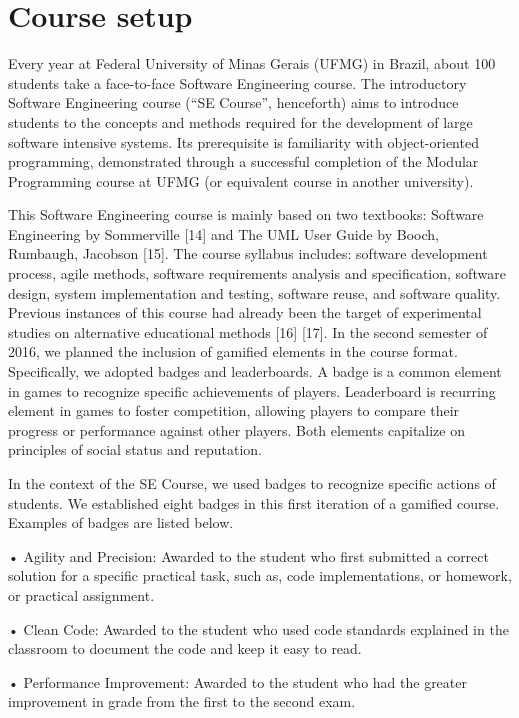 \section{Course setup}

Every year at Federal University of Minas Gerais (UFMG) in Brazil, about 100 students take a face-to-face Software Engineering course. The introductory Software Engineering course (“SE Course”, henceforth) aims to introduce students to the concepts and methods required for the development of large software intensive systems. Its prerequisite is familiarity with object-oriented programming, demonstrated through a successful completion of the Modular Programming course at UFMG (or equivalent course in another university).

This Software Engineering course is mainly based on two textbooks: Software Engineering by Sommerville [14] and The UML User Guide by Booch, Rumbaugh, Jacobson [15]. The course syllabus includes: software development process, agile methods, software requirements analysis and specification, software design, system implementation and testing, software reuse, and software quality.
Previous instances of this course had already been the target of experimental studies on alternative educational methods [16] [17]. In the second semester of 2016, we planned the inclusion of gamified elements in the course format. Specifically, we adopted badges and leaderboards. A badge is a common element in games to recognize specific achievements of players. Leaderboard is recurring element in games to foster competition, allowing players to compare their progress or performance against other players. Both elements capitalize on principles of social status and reputation.

In the context of the SE Course, we used badges to recognize specific actions of students. We established eight badges in this first iteration of a gamified course. Examples of badges are listed below.

•	Agility and Precision: Awarded to the student who first submitted a correct solution for a specific practical task, such as, code implementations, or homework, or practical assignment.

•	Clean Code: Awarded to the student who used code standards explained in the classroom to document the code and keep it easy to read.

•	Performance Improvement: Awarded to the student who had the greater improvement in grade from the first to the second exam.

